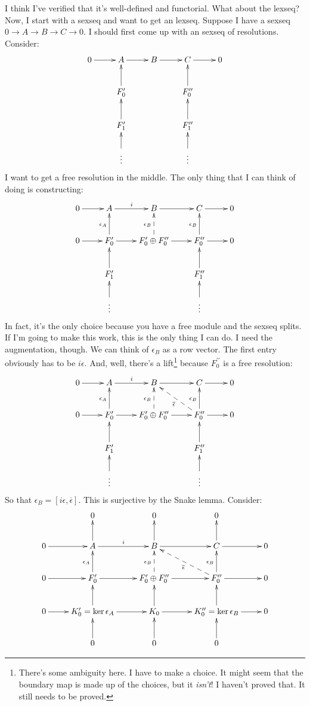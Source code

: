 \documentclass{amsart}
\theoremstyle{theorem}
\theoremstyle{definition}
\begin{document}
I think I've verified that it's well-defined and functorial. What about the lexseq? Now, I start with a sexseq and want to get an lexseq. Suppose I have a sexseq $0\to A\to B\to C\to 0$. I should first come up with an sexseq of resolutions. Consider:
\begin{equation*}
\xymatrix{0\ar[r] & A\ar[r] & B\ar[r] & C\ar[r] & 0\\
 & F^\prime_0\ar[u] & & F^{\prime\prime}_0\ar[u] & \\
 & F^\prime_1\ar[u] & & F^{\prime\prime}_1\ar[u] & \\
 & \vdots\ar[u] & & \vdots\ar[u] & }
\end{equation*}
I want to get a free resolution in the middle. The only thing that I can think of doing is constructing:
\begin{equation*}
\xymatrix{0\ar[r] & A\ar[r]^i & B\ar[r] & C\ar[r] & 0\\
0\ar[r] & F^\prime_0\ar[u]^{\epsilon_A}\ar[r] & F^\prime_0\oplus F^{\prime\prime}_0\ar@{-->}[u]^{\epsilon_B}\ar[r] & F^{\prime\prime}_0\ar[u]^{\epsilon_B}\ar[r] & 0 \\
 & F^\prime_1\ar[u] & & F^{\prime\prime}_1\ar[u] & \\
 & \vdots\ar[u] & & \vdots\ar[u] & }
\end{equation*}
In fact, it's the only choice because you have a free module and the sexseq splits. If I'm going to make this work, this is the only thing I can do. I need the augmentation, though. We can think of $\epsilon_B$ as a row vector. The first entry obviously has to be $i\epsilon$. And, well, there's a lift\footnote{There's some ambiguity here. I have to make a choice. It might seem that the boundary map is made up of the choices, but it \emph{isn't}! I haven't proved that. It still needs to be proved.} because $F^{\prime\prime}_0$ is a free resolution:
\begin{equation*}
\xymatrix{0\ar[r] & A\ar[r]^i & B\ar[r] & C\ar[r] & 0\\
0\ar[r] & F^\prime_0\ar[u]^{\epsilon_A}\ar[r] & F^\prime_0\oplus F^{\prime\prime}_0\ar@{-->}[u]^{\epsilon_B}\ar[r] & F^{\prime\prime}_0\ar[u]^{\epsilon_B}\ar@{-->}[ul]^{\overline{\epsilon}}\ar[r] & 0 \\
 & F^\prime_1\ar[u] & & F^{\prime\prime}_1\ar[u] & \\
 & \vdots\ar[u] & & \vdots\ar[u] & }
\end{equation*}
So that $\epsilon_B=[i\epsilon,\overline{\epsilon}]$. This is surjective by the Snake lemma. Consider:
\begin{equation*}
\xymatrix{& 0 & 0 & 0 & \\
0\ar[r] & A\ar[r]^i\ar[u] & B\ar[r]\ar[u] & C\ar[r]\ar[u] & 0\\
0\ar[r] & F^\prime_0\ar[u]^{\epsilon_A}\ar[r] & F^\prime_0\oplus F^{\prime\prime}_0\ar@{-->}[u]^{\epsilon_B}\ar[r] & F^{\prime\prime}_0\ar[u]^{\epsilon_B}\ar@{-->}[ul]^{\overline{\epsilon}}\ar[r] & 0\\
 0\ar[r] & K^\prime_0=\ker\epsilon_A\ar[u]\ar[r] & K_0\ar[r]\ar[u] & K^{\prime\prime}_0=\ker\epsilon_B\ar[u]\ar[r] & 0\\
 & 0\ar[u] & 0\ar[u] & 0\ar[u] & }
\end{equation*}
\end{document}
